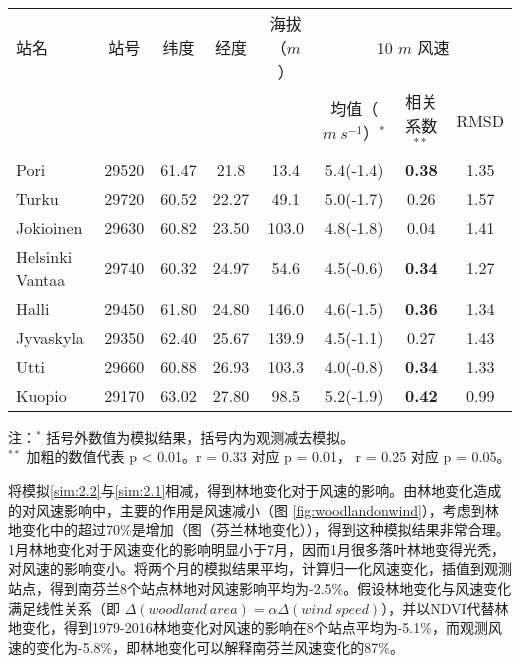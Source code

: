 \begin{table}[!htbp]
    \label{tab:Finlandstationinfo}
    \centering
    \small%
    \setlength{\tabcolsep}{5 pt}%
    \renewcommand{\arraystretch}{1.0}%
    \begin{tabular}{lccccccc}
        \hline
        站名 & 站号 & 纬度 & 经度 & 海拔（$m$）&  \multicolumn{3}{c}{10 $m$ 风速} \\
         & & & & & 均值（$m ~ s^{-1}$）$^*$ &  相关系数 $^ {**}$ & RMSD \\
        \hline
        Pori & 29520 & 61.47 & 21.8 & 13.4 & 5.4(-1.4) & \textbf{0.38} & 1.35 \\
        Turku & 29720 & 60.52 & 22.27 & 49.1 & 5.0(-1.7) & 0.26 & 1.57 \\
        Jokioinen & 29630 & 60.82 & 23.50 & 103.0 & 4.8(-1.8) & 0.04 & 1.41 \\
        Helsinki Vantaa & 29740 & 60.32 & 24.97 & 54.6 & 4.5(-0.6) & \textbf{0.34} & 1.27 \\
        Halli & 29450 & 61.80 & 24.80 & 146.0 & 4.6(-1.5) & \textbf{0.36} & 1.34 \\
        Jyvaskyla & 29350 & 62.40 & 25.67 & 139.9 & 4.5(-1.1) & 0.27 & 1.43 \\
        Utti & 29660 & 60.88 & 26.93 & 103.3 & 4.0(-0.8) & \textbf{0.34} & 1.33 \\
        Kuopio & 29170 & 63.02 & 27.80 & 98.5 & 5.2(-1.9) & \textbf{0.42} & 0.99 \\ 
        \hline
    \end{tabular}
    
     \vspace*{3ex}  
      
    \begin{minipage}{1\textwidth}%
    注：$^*$ 括号外数值为模拟结果，括号内为观测减去模拟。\\ 
    $^{**}$ 加粗的数值代表 p < 0.01。r = 0.33 对应 p = 0.01， r = 0.25 对应 p = 0.05。
    \end{minipage}
\end{table}


将模拟\ref{sim:2.2}与\ref{sim:2.1}相减，得到林地变化对于风速的影响。由林地变化造成的对风速影响中，主要的作用是风速减小（图 \ref{fig:woodlandonwind}），考虑到林地变化中的超过70\%是增加（图（芬兰林地变化）），得到这种模拟结果非常合理。1月林地变化对于风速变化的影响明显小于7月，因而1月很多落叶林地变得光秃，对风速的影响变小。将两个月的模拟结果平均，计算归一化风速变化，插值到观测站点，得到南芬兰8个站点林地对风速影响平均为-2.5\%。假设林地变化与风速变化满足线性关系（即 $\Delta(woodland ~ area) = \alpha \Delta(wind ~ speed)$），并以NDVI代替林地变化，得到1979-2016林地变化对风速的影响在8个站点平均为-5.1\%，而观测风速的变化为-5.8\%，即林地变化可以解释南芬兰风速变化的87\%。

